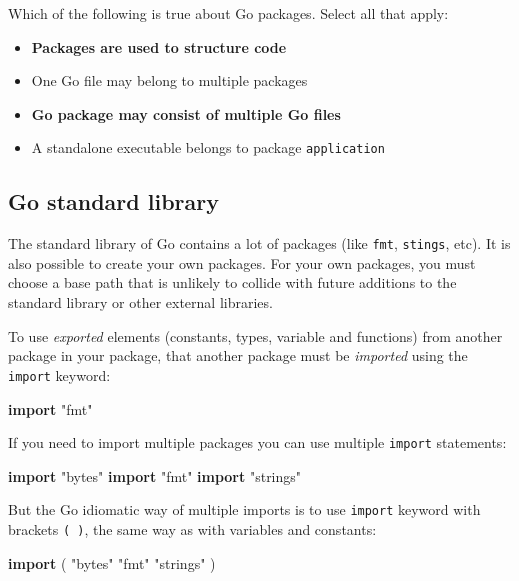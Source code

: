 \documentclass[]{book}
\newenvironment{Shaded}{\begin{snugshade}}{\end{snugshade}}
\newcommand{\KeywordTok}[1]{\textcolor[rgb]{0.13,0.29,0.53}{\textbf{#1}}}
\newcommand{\NormalTok}[1]{#1}
\newcommand{\StringTok}[1]{\textcolor[rgb]{0.31,0.60,0.02}{#1}}
\providecommand{\tightlist}{%
  \setlength{\itemsep}{0pt}\setlength{\parskip}{0pt}}
\begin{document}
Which of the following is true about Go packages. Select all that apply:

\begin{itemize}
\tightlist
\item
  \textbf{Packages are used to structure code}
\item
  One Go file may belong to multiple packages
\item
  \textbf{Go package may consist of multiple Go files}
\item
  A standalone executable belongs to package \texttt{application}
\end{itemize}

\hypertarget{go-standard-library}{%
\subsection{Go standard library}\label{go-standard-library}}

The standard library of Go contains a lot of packages (like \texttt{fmt}, \texttt{stings},
etc). It is also possible to create your own packages. For your own packages,
you must choose a base path that is unlikely to collide with future additions
to the standard library or other external libraries.

To use \emph{exported} elements (constants, types, variable and functions) from
another package in your package, that another package must be \emph{imported} using
the \texttt{import} keyword:

\begin{Shaded}
\begin{Highlighting}[]
\KeywordTok{import} \StringTok{"fmt"}
\end{Highlighting}
\end{Shaded}

If you need to import multiple packages you can use multiple \texttt{import}
statements:

\begin{Shaded}
\begin{Highlighting}[]
\KeywordTok{import} \StringTok{"bytes"}
\KeywordTok{import} \StringTok{"fmt"}
\KeywordTok{import} \StringTok{"strings"}
\end{Highlighting}
\end{Shaded}

But the Go idiomatic way of multiple imports is to use \texttt{import} keyword with
brackets \texttt{(\ )}, the same way as with variables and constants:

\begin{Shaded}
\begin{Highlighting}[]
\KeywordTok{import}\NormalTok{ (}
    \StringTok{"bytes"}
    \StringTok{"fmt"}
    \StringTok{"strings"}
\NormalTok{)}
\end{Highlighting}
\end{Shaded}
\end{document}
